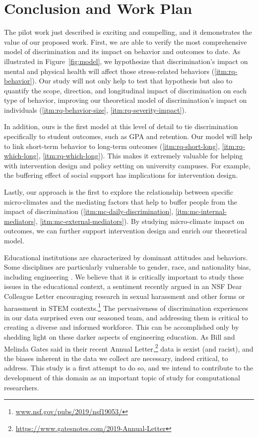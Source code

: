 \section{Conclusion and Work Plan}
\label{sec:conclusion}
The pilot work just described is exciting and compelling, and it demonstrates the value of our proposed work. First, we are able to verify the most comprehensive model of discrimination and its impact on behavior and outcomes to date. As illustrated in Figure~\ref{fig:model}, we hypothesize that discrimination's impact on mental and physical health will affect those stress-related behaviors (\ref{itm:rq-behavior}). Our study will not only help to test that hypothesis but also to quantify the scope, direction, and longitudinal impact of discrimination on each type of behavior, improving our theoretical model of discrimination's impact on individuals (\ref{itm:rq-behavior-size}, \ref{itm:rq-severity-impact}).
 
 In addition, ours is the first model at this level of detail to tie discrimination specifically to student outcomes, such as GPA and retention. Our model will help to link short-term behavior to long-term outcomes (\ref{itm:rq-short-long}, \ref{itm:rq-which-long}, \ref{itm:rq-which-long}). This makes it extremely valuable for helping with intervention design and policy setting on university campuses.
 For example, the buffering effect of social support has implications for intervention design. 

Lastly, our approach is the first to explore the relationship between specific micro-climates and the mediating factors that help to buffer people from the impact of discrimination (\ref{itm:mc-daily-discrimination}, \ref{itm:mc-internal-mediators}, \ref{itm:mc-external-mediators}). By studying micro-climate impact on outcomes, we can further support intervention design and enrich our theoretical model. 

Educational institutions are characterized by dominant attitudes and behaviors. Some disciplines are particularly vulnerable to gender, race, and nationality bias, including  engineering \cite{sevo2010bias}.  We believe that it is critically important to study these issues in the educational context, a sentiment recently argued in an NSF Dear Colleague Letter encouraging research in sexual harassment and other forms or harassment in STEM contexts.\footnote{\url{www.nsf.gov/pubs/2019/nsf19053/}} The pervasiveness of discrimination experiences in our data surprised even our seasoned team, and addressing them is critical to creating a diverse and informed workforce. This can be accomplished only by shedding light on these darker aspects of engineering education. As Bill and Melinda Gates said in their  recent Annual Letter,\footnote{\url{https://www.gatesnotes.com/2019-Annual-Letter}} data is sexist (and racist), and the biases inherent in the data we collect are necessary, indeed critical, to address. This study is a first attempt to do so, and we intend to contribute to the development of this domain as an important topic of study for computational researchers.   

